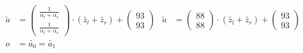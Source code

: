 \begin{align*}
%
\widetilde{a} &=
\begin{pmatrix}\frac{1}{\alpha_l+\alpha_r}\\
\frac{1}{\alpha_l+\alpha_r}\end{pmatrix}
\cdot (\widetilde{z_l} + \widetilde{z_r}) +
\begin{pmatrix}93\\93\end{pmatrix}
&
\widetilde{a} &=
\begin{pmatrix}88\\88\end{pmatrix}
\cdot (\widetilde{z_l} + \widetilde{z_r}) +
\begin{pmatrix}93\\93\end{pmatrix}\\
%
o &= \widetilde{a_0} = \widetilde{a_1} \\
\end{align*}\\


